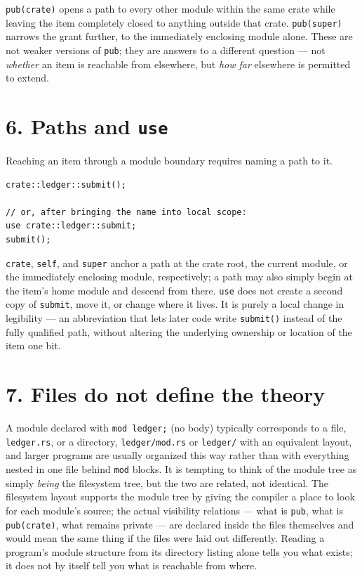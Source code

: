 \documentclass[11pt]{book}
\begin{document}
\texttt{pub(crate)} opens a path to every other module within the same crate while leaving the item completely closed to anything outside that crate. \texttt{pub(super)} narrows the grant further, to the immediately enclosing module alone. These are not weaker versions of \texttt{pub}; they are answers to a different question --- not \emph{whether} an item is reachable from elsewhere, but \emph{how far} elsewhere is permitted to extend.

\section*{6. Paths and \texttt{use}}

Reaching an item through a module boundary requires naming a path to it.

\begin{lstlisting}
crate::ledger::submit();

// or, after bringing the name into local scope:
use crate::ledger::submit;
submit();
\end{lstlisting}

\texttt{crate}, \texttt{self}, and \texttt{super} anchor a path at the crate root, the current module, or the immediately enclosing module, respectively; a path may also simply begin at the item's home module and descend from there. \texttt{use} does not create a second copy of \texttt{submit}, move it, or change where it lives. It is purely a local change in legibility --- an abbreviation that lets later code write \texttt{submit()} instead of the fully qualified path, without altering the underlying ownership or location of the item one bit.

\section*{7. Files do not define the theory}

A module declared with \texttt{mod ledger;} (no body) typically corresponds to a file, \texttt{ledger.rs}, or a directory, \texttt{ledger/mod.rs} or \texttt{ledger/} with an equivalent layout, and larger programs are usually organized this way rather than with everything nested in one file behind \texttt{mod} blocks. It is tempting to think of the module tree as simply \emph{being} the filesystem tree, but the two are related, not identical. The filesystem layout supports the module tree by giving the compiler a place to look for each module's source; the actual visibility relations --- what is \texttt{pub}, what is \texttt{pub(crate)}, what remains private --- are declared inside the files themselves and would mean the same thing if the files were laid out differently. Reading a program's module structure from its directory listing alone tells you what exists; it does not by itself tell you what is reachable from where.
\end{document}
